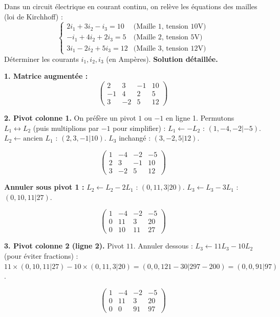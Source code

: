\documentclass[11pt]{article}
\begin{document}
\begin{exoresolu}
Dans un circuit électrique en courant continu, on relève les équations des mailles (loi de Kirchhoff) :
\[
\begin{cases}
2i_1 + 3i_2 - i_3 = 10 & \text{(Maille 1, tension 10V)} \\
-i_1 + 4i_2 + 2i_3 = 5 & \text{(Maille 2, tension 5V)} \\
3i_1 - 2i_2 + 5i_3 = 12 & \text{(Maille 3, tension 12V)}
\end{cases}
\]
Déterminer les courants $i_1, i_2, i_3$ (en Ampères).
\tcblower
\textbf{Solution détaillée.}

\noindent\textbf{1. Matrice augmentée :}
\[
\left(\begin{array}{ccc|c}
2 & 3 & -1 & 10 \\
-1 & 4 & 2 & 5 \\
3 & -2 & 5 & 12
\end{array}\right)
\]

\noindent\textbf{2. Pivot colonne 1.} On préfère un pivot $1$ ou $-1$ en ligne 1. Permutons $L_1 \leftrightarrow L_2$ (puis multiplions par $-1$ pour simplifier) :
$L_1 \leftarrow -L_2$ : $(1, -4, -2 | -5)$.
$L_2 \leftarrow \text{ancien } L_1$ : $(2, 3, -1 | 10)$.
$L_3$ inchangé : $(3, -2, 5 | 12)$.

\[
\left(\begin{array}{ccc|c}
1 & -4 & -2 & -5 \\
2 & 3 & -1 & 10 \\
3 & -2 & 5 & 12
\end{array}\right)
\]

\noindent\textbf{Annuler sous pivot 1 :}
$L_2 \leftarrow L_2 - 2L_1$ : $(0, 11, 3 | 20)$.
$L_3 \leftarrow L_3 - 3L_1$ : $(0, 10, 11 | 27)$.

\[
\left(\begin{array}{ccc|c}
1 & -4 & -2 & -5 \\
0 & 11 & 3 & 20 \\
0 & 10 & 11 & 27
\end{array}\right)
\]

\noindent\textbf{3. Pivot colonne 2 (ligne 2).} Pivot $11$. Annuler dessous :
$L_3 \leftarrow 11 L_3 - 10 L_2$ (pour éviter fractions) :
$11\times(0, 10, 11 | 27) - 10\times(0, 11, 3 | 20) = (0, 0, 121-30 | 297-200) = (0, 0, 91 | 97)$.

\[
\left(\begin{array}{ccc|c}
1 & -4 & -2 & -5 \\
0 & 11 & 3 & 20 \\
0 & 0 & 91 & 97
\end{array}\right)
\]


\end{exoresolu}
\end{document}
